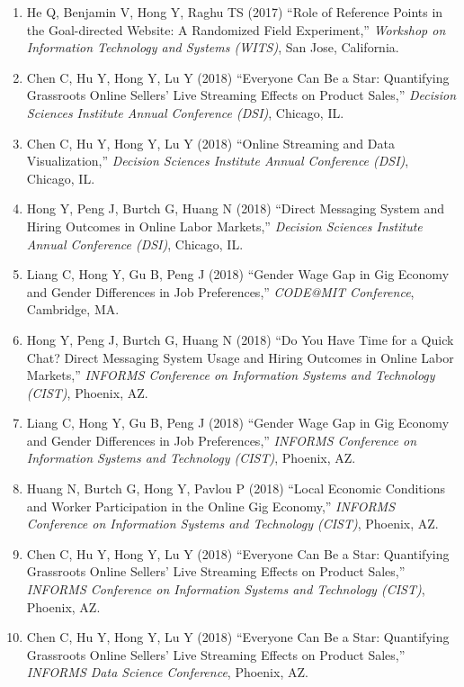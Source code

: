 \documentclass[paper=letter,fontsize=10pt]{scrartcl} %
\newcommand{\ConfEntry}[6]{
		\noindent #1 (#2) ``#3,'' \textit{#4}, #5. \textcolor{blue}{#6}}
\newcommand{\Hong}{Hong Y}
\begin{document}
\begin{enumerate}
\item \ConfEntry{He Q, Benjamin V, \Hong, Raghu TS}{2017}{Role of Reference Points in the Goal-directed Website: A Randomized Field Experiment}{Workshop on Information Technology and Systems (WITS)}{San Jose, California}{}

\item \ConfEntry{Chen C, Hu Y, \Hong, Lu Y}{2018}{Everyone Can Be a Star: Quantifying Grassroots Online Sellers' Live Streaming Effects on Product Sales}{Decision Sciences Institute Annual Conference (DSI)}{Chicago, IL}{}

\item \ConfEntry{Chen C, Hu Y, \Hong, Lu Y}{2018}{Online Streaming and Data Visualization}{Decision Sciences Institute Annual Conference (DSI)}{Chicago, IL}{}

\item \ConfEntry{\Hong, Peng J, Burtch G, Huang N}{2018}{Direct Messaging System and Hiring Outcomes in Online Labor Markets}{Decision Sciences Institute Annual Conference (DSI)}{Chicago, IL}{}

\item \ConfEntry{Liang C, \Hong, Gu B, Peng J}{2018}{Gender Wage Gap in Gig Economy and Gender Differences in Job Preferences}{CODE{@}MIT Conference}{Cambridge, MA}{}

\item \ConfEntry{\Hong, Peng J, Burtch G, Huang N}{2018}{Do You Have Time for a Quick Chat? Direct Messaging System Usage and Hiring Outcomes in Online Labor Markets}{INFORMS Conference on Information Systems and Technology (CIST)}{Phoenix, AZ}{}

\item \ConfEntry{Liang C, \Hong, Gu B, Peng J}{2018}{Gender Wage Gap in Gig Economy and Gender Differences in Job Preferences}{INFORMS Conference on Information Systems and Technology (CIST)}{Phoenix, AZ}{}

\item \ConfEntry{Huang N, Burtch G, \Hong, Pavlou P}{2018}{Local Economic Conditions and Worker Participation in the Online Gig Economy}{INFORMS Conference on Information Systems and Technology (CIST)}{Phoenix, AZ}{}

\item \ConfEntry{Chen C, Hu Y, \Hong, Lu Y}{2018}{Everyone Can Be a Star: Quantifying Grassroots Online Sellers' Live Streaming Effects on Product Sales}{INFORMS Conference on Information Systems and Technology (CIST)}{Phoenix, AZ}{}

\item \ConfEntry{Chen C, Hu Y, \Hong, Lu Y}{2018}{Everyone Can Be a Star: Quantifying Grassroots Online Sellers' Live Streaming Effects on Product Sales}{INFORMS Data Science Conference}{Phoenix, AZ}{}


\end{enumerate}
\end{document}
